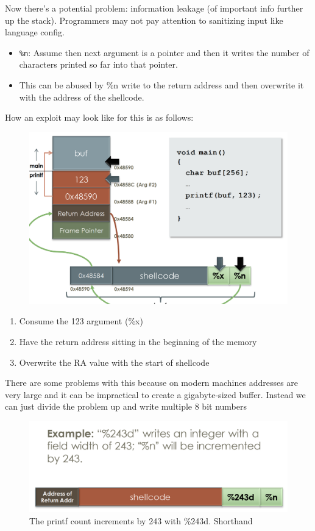 \documentclass[../notes.tex]{subfiles}
\begin{document}
Now there's a potential problem: information leakage (of important info further up the stack).
Programmers may not pay attention to sanitizing input like language config.


\begin{itemize}
    \item \texttt{\%n}: Assume then next argument is a pointer and then it writes the number of characters printed so far into that pointer. 
    \item This can be abused by \%n  write to the return address and then overwrite it with the address of the shellcode.
\end{itemize}


How an exploit may look like for this is as follows:

\begin{figure}[H]
    \centering
    \includegraphics[width=0.8\linewidth]{img/image_2023-01-16-19-39-16.png}
\end{figure}

\begin{enumerate}
    \item Consume the 123 argument (\%x)
    \item Have the return address sitting in the beginning of the memory
    \item Overwrite the RA value with the start of shellcode
\end{enumerate}

There are some problems with this because on modern machines addresses are very large and it can be impractical to create a gigabyte-sized buffer.
Instead we can just divide the problem up and write multiple 8 bit numbers

\begin{figure}[H]
    \centering
    \includegraphics[width=0.8\linewidth]{img/image_2023-01-16-19-46-14.png}
    \caption{The printf count increments by 243 with \%243d. Shorthand}
\end{figure}
\end{document}
